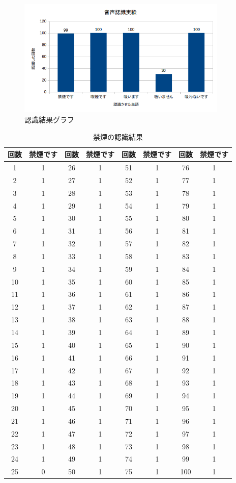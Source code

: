 \documentclass[12pt,oneside]{sotsuken_paper}
\begin{document}
\begin{figure}[htbp]
\begin{center}
\includegraphics[width=100mm]{img/result.png}
\caption{認識結果グラフ}
\label{fig:result}
\end{center}
\end{figure}


\begin{table}[htb]
\begin{center}
\caption{禁煙の認識結果}
\begin{tabular}{|c|c|c|c|c|c|c|c|}\hline
回数&禁煙です&回数&禁煙です&回数&禁煙です&回数&禁煙です\\\hline
1&1&26&1&51&1&76&1\\\hline
2&1&27&1&52&1&77&1\\\hline
3&1&28&1&53&1&78&1\\\hline
4&1&29&1&54&1&79&1\\\hline
5&1&30&1&55&1&80&1\\\hline
6&1&31&1&56&1&81&1\\\hline
7&1&32&1&57&1&82&1\\\hline
8&1&33&1&58&1&83&1\\\hline
9&1&34&1&59&1&84&1\\\hline
10&1&35&1&60&1&85&1\\\hline
11&1&36&1&61&1&86&1\\\hline
12&1&37&1&62&1&87&1\\\hline
13&1&38&1&63&1&88&1\\\hline
14&1&39&1&64&1&89&1\\\hline
15&1&40&1&65&1&90&1\\\hline
16&1&41&1&66&1&91&1\\\hline
17&1&42&1&67&1&92&1\\\hline
18&1&43&1&68&1&93&1\\\hline
19&1&44&1&69&1&94&1\\\hline
20&1&45&1&70&1&95&1\\\hline
21&1&46&1&71&1&96&1\\\hline
22&1&47&1&72&1&97&1\\\hline
23&1&48&1&73&1&98&1\\\hline
24&1&49&1&74&1&99&1\\\hline
25&0&50&1&75&1&100&1
\\\hline	
\end{tabular}
\label{tab:another-nosmokerecogresult}
\end{center}
\end{table}
\end{document}
